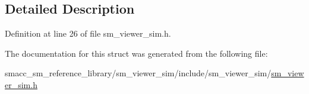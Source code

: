\subsection{Detailed Description}


Definition at line 26 of file sm\+\_\+viewer\+\_\+sim.\+h.



The documentation for this struct was generated from the following file\+:\begin{DoxyCompactItemize}
\item 
smacc\+\_\+sm\+\_\+reference\+\_\+library/sm\+\_\+viewer\+\_\+sim/include/sm\+\_\+viewer\+\_\+sim/\hyperlink{sm__viewer__sim_8h}{sm\+\_\+viewer\+\_\+sim.\+h}\end{DoxyCompactItemize}
